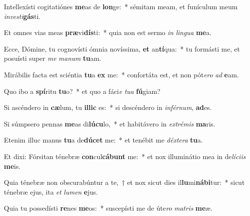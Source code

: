 \item Intellexísti cogitatiónes \textbf{me}as de \textbf{lon}ge:~* sémitam meam, et funículum meum \textit{in}\textit{ves}\textit{ti}\textbf{gás}ti.
\item Et omnes vias meas \textbf{præ}vi\textbf{dís}ti:~* quia non est sermo \textit{in} \textit{lin}\textit{gua} \textbf{me}a.
\item Ecce, Dómine, tu cognovísti ómnia novíssima, \textbf{et} an\textbf{tí}qua:~* tu formásti me, et posuísti super \textit{me} \textit{ma}\textit{num} \textbf{tu}am.
\item Mirábilis facta est sciéntia \textbf{tu}a \textbf{ex} me:~* confortáta est, et non pót\textit{e}\textit{ro} \textit{ad} \textbf{e}am.
\item Quo ibo a \textbf{spí}ritu \textbf{tu}o?~* et quo a fáci\textit{e} \textit{tu}\textit{a} \textbf{fú}giam?
\item Si ascéndero in \textbf{cæ}lum, tu \textbf{il}\textbf{lic} es:~* si descéndero in \textit{in}\textit{fér}\textit{num}, \textbf{ad}es.
\item Si súmpsero pennas \textbf{me}as di\textbf{lú}\textbf{cu}lo,~* et habitávero in \textit{ex}\textit{tré}\textit{mis} \textbf{ma}ris.
\item Etenim illuc manus \textbf{tu}a de\textbf{dú}\textbf{cet} me:~* et tenébit me \textit{déx}\textit{te}\textit{ra} \textbf{tu}a.
\item Et dixi: Fórsitan ténebræ \textbf{con}cul\textbf{cá}\textbf{bunt} me:~* et nox illuminátio mea in de\textit{lí}\textit{ci}\textit{is} \textbf{me}is.
\item Quia ténebræ non obscurabúntur a te,~† et nox sicut dies il\textbf{lu}mi\textbf{ná}\textbf{bi}tur:~* sicut ténebræ ejus, ita \textit{et} \textit{lu}\textit{men} \textbf{e}jus.
\item Quia tu possedísti \textbf{re}nes \textbf{me}os:~* suscepísti me de úte\textit{ro} \textit{ma}\textit{tris} \textbf{me}æ.
